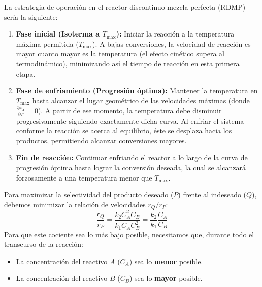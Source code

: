 La estrategia de operación en el reactor discontinuo mezcla perfecta (RDMP) sería la siguiente:
\begin{enumerate}
	\item \textbf{Fase inicial (Isoterma a $T_{\text{max}}$):} Iniciar la reacción a la temperatura máxima permitida ($T_{\text{max}}$). A bajas conversiones, la velocidad de reacción es mayor cuanto mayor es la temperatura (el efecto cinético supera al termodinámico), minimizando así el tiempo de reacción en esta primera etapa.
	\item \textbf{Fase de enfriamiento (Progresión óptima):} Mantener la temperatura en $T_{\text{max}}$ hasta alcanzar el lugar geométrico de las velocidades máximas (donde $\frac{\partial r_A}{\partial T} = 0$). A partir de ese momento, la temperatura debe disminuir progresivamente siguiendo exactamente dicha curva. Al enfriar el sistema conforme la reacción se acerca al equilibrio, éste se desplaza hacia los productos, permitiendo alcanzar conversiones mayores.
	\item \textbf{Fin de reacción:} Continuar enfriando el reactor a lo largo de la curva de progresión óptima hasta lograr la conversión deseada, la cual se alcanzará forzosamente a una temperatura menor que $T_{\text{max}}$.
\end{enumerate}

\solve{}
Para maximizar la selectividad del producto deseado ($P$) frente al indeseado ($Q$), debemos minimizar la relación de velocidades $r_Q / r_P$:
\begin{equation*}
	\frac{r_Q}{r_P} = \frac{k_2 C_A^2 C_B}{k_1 C_A C_B^2} = \frac{k_2}{k_1} \frac{C_A}{C_B}
\end{equation*}
Para que este cociente sea lo más bajo posible, necesitamos que, durante todo el transcurso de la reacción:
\begin{itemize}
	\item La concentración del reactivo $A$ ($C_A$) sea lo \textbf{menor} posible.
	\item La concentración del reactivo $B$ ($C_B$) sea lo \textbf{mayor} posible.
\end{itemize}

